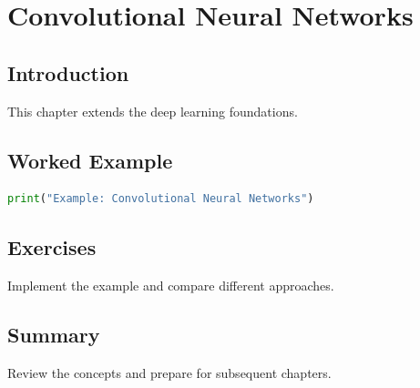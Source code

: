 \chapter{Convolutional Neural Networks}
\label{chap:vol7-9}



\section{Introduction}
This chapter extends the deep learning foundations.

\section{Worked Example}
\begin{lstlisting}[language=Python]
print("Example: Convolutional Neural Networks")
\end{lstlisting}

\section{Exercises}
\begin{exercise}
Implement the example and compare different approaches.
\end{exercise}

\section{Summary}
Review the concepts and prepare for subsequent chapters.
